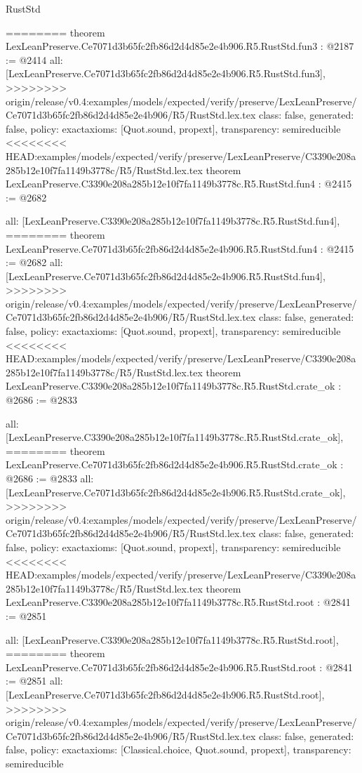 \begin{lexlean}{RustStd}
\begin{coremodule}
{\begin{coremodule}
{{{{{{========
theorem LexLeanPreserve.Ce7071d3b65fc2fb86d2d4d85e2e4b906.R5.RustStd.fun3 : @2187 := @2414 {
  all: [LexLeanPreserve.Ce7071d3b65fc2fb86d2d4d85e2e4b906.R5.RustStd.fun3],
>>>>>>>> origin/release/v0.4:examples/models/expected/verify/preserve/LexLeanPreserve/Ce7071d3b65fc2fb86d2d4d85e2e4b906/R5/RustStd.lex.tex
  class: false,
  generated: false,
  policy: exact{axioms: [Quot.sound, propext]},
  transparency: semireducible
}
<<<<<<<< HEAD:examples/models/expected/verify/preserve/LexLeanPreserve/C3390e208a285b12e10f7fa1149b3778c/R5/RustStd.lex.tex
theorem LexLeanPreserve.C3390e208a285b12e10f7fa1149b3778c.R5.RustStd.fun4 : @2415 := @2682 {
  all: [LexLeanPreserve.C3390e208a285b12e10f7fa1149b3778c.R5.RustStd.fun4],
========
theorem LexLeanPreserve.Ce7071d3b65fc2fb86d2d4d85e2e4b906.R5.RustStd.fun4 : @2415 := @2682 {
  all: [LexLeanPreserve.Ce7071d3b65fc2fb86d2d4d85e2e4b906.R5.RustStd.fun4],
>>>>>>>> origin/release/v0.4:examples/models/expected/verify/preserve/LexLeanPreserve/Ce7071d3b65fc2fb86d2d4d85e2e4b906/R5/RustStd.lex.tex
  class: false,
  generated: false,
  policy: exact{axioms: [Quot.sound, propext]},
  transparency: semireducible
}
<<<<<<<< HEAD:examples/models/expected/verify/preserve/LexLeanPreserve/C3390e208a285b12e10f7fa1149b3778c/R5/RustStd.lex.tex
theorem LexLeanPreserve.C3390e208a285b12e10f7fa1149b3778c.R5.RustStd.crate_ok : @2686 := @2833 {
  all: [LexLeanPreserve.C3390e208a285b12e10f7fa1149b3778c.R5.RustStd.crate_ok],
========
theorem LexLeanPreserve.Ce7071d3b65fc2fb86d2d4d85e2e4b906.R5.RustStd.crate_ok : @2686 := @2833 {
  all: [LexLeanPreserve.Ce7071d3b65fc2fb86d2d4d85e2e4b906.R5.RustStd.crate_ok],
>>>>>>>> origin/release/v0.4:examples/models/expected/verify/preserve/LexLeanPreserve/Ce7071d3b65fc2fb86d2d4d85e2e4b906/R5/RustStd.lex.tex
  class: false,
  generated: false,
  policy: exact{axioms: [Quot.sound, propext]},
  transparency: semireducible
}
<<<<<<<< HEAD:examples/models/expected/verify/preserve/LexLeanPreserve/C3390e208a285b12e10f7fa1149b3778c/R5/RustStd.lex.tex
theorem LexLeanPreserve.C3390e208a285b12e10f7fa1149b3778c.R5.RustStd.root : @2841 := @2851 {
  all: [LexLeanPreserve.C3390e208a285b12e10f7fa1149b3778c.R5.RustStd.root],
========
theorem LexLeanPreserve.Ce7071d3b65fc2fb86d2d4d85e2e4b906.R5.RustStd.root : @2841 := @2851 {
  all: [LexLeanPreserve.Ce7071d3b65fc2fb86d2d4d85e2e4b906.R5.RustStd.root],
>>>>>>>> origin/release/v0.4:examples/models/expected/verify/preserve/LexLeanPreserve/Ce7071d3b65fc2fb86d2d4d85e2e4b906/R5/RustStd.lex.tex
  class: false,
  generated: false,
  policy: exact{axioms: [Classical.choice, Quot.sound, propext]},
  transparency: semireducible
}

}}}}}}}}}
\end{coremodule}}
\end{coremodule}
\end{lexlean}
